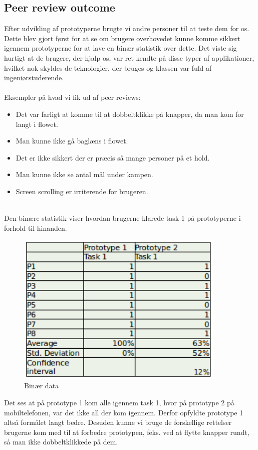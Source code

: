 \newpage
\subsection*{Peer review outcome}
Efter udvikling af prototyperne brugte vi andre personer til at teste dem for os. Dette blev gjort først for at se om brugere overhovedet kunne komme sikkert igennem prototyperne for at lave en binær statistik over dette. Det viste sig hurtigt at de brugere, der hjalp os, var ret kendte på disse typer af applikationer, hvilket nok skyldes de teknologier, der bruges og klassen var fuld af ingeniørstuderende.\\\\Eksempler på hvad vi fik ud af peer reviews:
\begin{itemize}
\item Det var farligt at komme til at dobbeltklikke på knapper, da man kom for langt i flowet.
\item Man kunne ikke gå baglæns i flowet.
\item Det er ikke sikkert der er præcis så mange personer på et hold.
\item Man kunne ikke se antal mål under kampen.
\item Screen scrolling er irriterende for brugeren.\\\\
\end{itemize} 

Den binære statistik viser hvordan brugerne klarede task 1 på prototyperne i forhold til hinanden.
\begin{figure}[ht!]
\centering
\includegraphics[width=100mm]{images/binary}
\caption{Binær data}
\end{figure}
Det ses at på prototype 1 kom alle igennem task 1, hvor på prototype 2 på mobiltelefonen, var det ikke all der kom igennem. Derfor opfyldte prototype 1 altså formålet langt bedre. Desuden kunne vi bruge de forskellige rettelser brugerne kom med til at forbedre prototypen, feks. ved at flytte knapper rundt, så man ikke dobbeltklikkede på dem.\\\\

